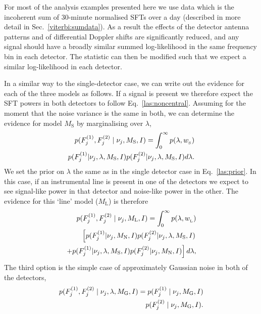 %
%
For most of the analysis examples presented here we use data which is the incoherent sum of 30-minute normalised \acp{SFT} over a day (described in more detail in Sec.~\ref{viterbi:sumdata}). As a result the effects of the detector antenna patterns and of differential Doppler shifts are significantly reduced, and any signal should have a broadly similar summed log-likelihood in the same frequency bin in each detector. The statistic can then be modified such that we expect a similar log-likelihood in each detector.

In a similar way to the single-detector case, we can write out the evidence for each of the three models as follows. If a signal is present we therefore expect the \ac{SFT} powers in both detectors to follow Eq.~\ref{las:noncentral}.  Assuming for the moment that the noise variance is the same in both, we can determine the evidence for model $M_{\text{S}}$ by marginalising over $\lambda$,
%
\begin{equation}
\label{las:signal}
\begin{split}
p(F^{(1)}_{j},F^{(2)}_{j} \mid \nu_j,M_{\rm{S}},I) = \int_0^{\infty}  p(\lambda,w_{\rm_S}) \\
p(F^{(1)}_{j}|\nu_j,\lambda,M_{\text{S}},I)p(F^{(2)}_{j}|\nu_j,\lambda,M_{\text{S}},I) d\lambda.
\end{split}
\end{equation}
%
We set the prior on $\lambda$ the same as in the single detector case in Eq.~\ref{las:prior}.
In this case, if an instrumental line is present in one of the detectors we expect to see signal-like power in that detector and noise-like power in the other.  The evidence for this `line' model ($M_{\text{L}}$) is therefore
%
\begin{equation}
\label{las:line}
\begin{split}
p(F^{(1)}_{j},F^{(2)}_{j} \mid \nu_j,M_{\rm{L}},I) = \int_0^{\infty}  p(\lambda,w_{\rm_L}) \\
\left[ p(F^{(1)}_{j}|\nu_j,M_{\rm{N}},I)p(F^{(2)}_{j}|\nu_j,\lambda,M_{\rm{S}},I) \right. \\
\left. + p(F^{(1)}_{j}|\nu_j,\lambda,M_{\rm{S}},I)p(F^{(2)}_{j}|\nu_j,M_{\rm{N}},I)\right]d\lambda ,
\end{split}
\end{equation}
%
The third option is the simple case of approximately Gaussian noise in both of the detectors,
%
\begin{equation}
\label{las:noise}
\begin{split}
p(F^{(1)}_{j},F^{(2)}_{j} \mid \nu_j,\lambda,M_{\rm{G}},I) = p(F^{(1)}_{j} \mid \nu_j,M_{\rm{G}},I) \\
p(F^{(2)}_{j} \mid \nu_j,M_{\rm{G}},I) .
\end{split}
\end{equation}

